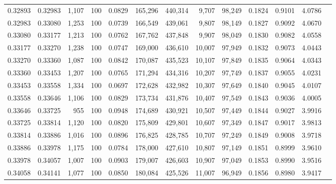 \begin{tabular}{rrrrrrrrrrrrr}
0.32893 & 0.32983 & 1,107 & 100 &                                     0.0829 & 165,296 & 440,314 &   9,707 &  98,249 & 0.1824 & 0.9101 & 4.0786 \\
0.32983 & 0.33080 & 1,253 & 100 &                                     0.0739 & 166,549 & 439,061 &   9,807 &  98,149 & 0.1827 & 0.9092 & 4.0670 \\
0.33080 & 0.33177 & 1,213 & 100 &                                     0.0762 & 167,762 & 437,848 &   9,907 &  98,049 & 0.1830 & 0.9082 & 4.0558 \\
0.33177 & 0.33270 & 1,238 & 100 &                                     0.0747 & 169,000 & 436,610 &  10,007 &  97,949 & 0.1832 & 0.9073 & 4.0443 \\
0.33270 & 0.33360 & 1,087 & 100 &                                     0.0842 & 170,087 & 435,523 &  10,107 &  97,849 & 0.1835 & 0.9064 & 4.0343 \\
0.33360 & 0.33453 & 1,207 & 100 &                                     0.0765 & 171,294 & 434,316 &  10,207 &  97,749 & 0.1837 & 0.9055 & 4.0231 \\
0.33453 & 0.33558 & 1,334 & 100 &                                     0.0697 & 172,628 & 432,982 &  10,307 &  97,649 & 0.1840 & 0.9045 & 4.0107 \\
0.33558 & 0.33646 & 1,106 & 100 &                                     0.0829 & 173,734 & 431,876 &  10,407 &  97,549 & 0.1843 & 0.9036 & 4.0005 \\
0.33646 & 0.33725 &   955 & 100 &                                     0.0948 & 174,689 & 430,921 &  10,507 &  97,449 & 0.1844 & 0.9027 & 3.9916 \\
0.33725 & 0.33814 & 1,120 & 100 &                                     0.0820 & 175,809 & 429,801 &  10,607 &  97,349 & 0.1847 & 0.9017 & 3.9813 \\
0.33814 & 0.33886 & 1,016 & 100 &                                     0.0896 & 176,825 & 428,785 &  10,707 &  97,249 & 0.1849 & 0.9008 & 3.9718 \\
0.33886 & 0.33978 & 1,175 & 100 &                                     0.0784 & 178,000 & 427,610 &  10,807 &  97,149 & 0.1851 & 0.8999 & 3.9610 \\
0.33978 & 0.34057 & 1,007 & 100 &                                     0.0903 & 179,007 & 426,603 &  10,907 &  97,049 & 0.1853 & 0.8990 & 3.9516 \\
0.34058 & 0.34141 & 1,077 & 100 &                                     0.0850 & 180,084 & 425,526 &  11,007 &  96,949 & 0.1856 & 0.8980 & 3.9417 \\

\end{tabular}
